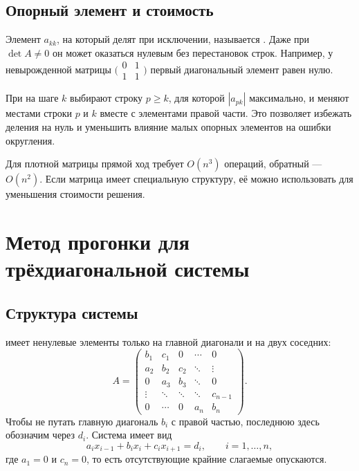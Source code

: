 \documentclass[../final.tex]{subfiles}
\begin{document}
\subsection{Опорный элемент и стоимость}

Элемент $a_{kk}$, на который делят при исключении, называется
. Даже при $\det A\ne0$ он может оказаться нулевым
без перестановок строк. Например, у невырожденной матрицы
$\bigl(\begin{smallmatrix}0&1\\1&1\end{smallmatrix}\bigr)$ первый
диагональный элемент равен нулю.

При  на шаге $k$
выбирают строку $p\ge k$, для которой $|a_{pk}|$ максимально,
и меняют местами строки $p$ и $k$ вместе с элементами правой части.
Это позволяет избежать деления на нуль и уменьшить влияние
малых опорных элементов на ошибки округления.

Для плотной матрицы прямой ход требует $O(n^3)$ операций,
обратный --- $O(n^2)$. Если матрица имеет специальную структуру,
её можно использовать для уменьшения стоимости решения.

\section{Метод прогонки для трёхдиагональной системы}

\subsection{Структура системы}

 имеет ненулевые элементы
только на главной диагонали и на двух соседних:
\begin{equation*}
    A=\begin{pmatrix}
        b_1&c_1&0&\cdots&0\\
        a_2&b_2&c_2&\ddots&\vdots\\
        0&a_3&b_3&\ddots&0\\
        \vdots&\ddots&\ddots&\ddots&c_{n-1}\\
        0&\cdots&0&a_n&b_n
    \end{pmatrix}.
\end{equation*}
Чтобы не путать главную диагональ $b_i$ с правой частью, последнюю
здесь обозначим через $d_i$. Система имеет вид
\begin{equation*}
    a_i x_{i-1}+b_i x_i+c_i x_{i+1}=d_i,
    \qquad i=1,\ldots,n,
\end{equation*}
где $a_1=0$ и $c_n=0$, то есть отсутствующие крайние слагаемые опускаются.
\end{document}
